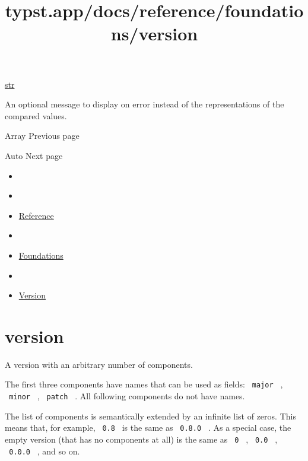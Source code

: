 \href{/docs/reference/foundations/str/}{str}

An optional message to display on error instead of the representations
of the compared values.

\href{/docs/reference/foundations/array/}{\pandocbounded{}}

{ Array } { Previous page }

\href{/docs/reference/foundations/auto/}{\pandocbounded{}}

{ Auto } { Next page }


\title{typst.app/docs/reference/foundations/version}

\begin{itemize}
\tightlist
\item
  \href{/docs}{}
\item
  
\item
  \href{/docs/reference/}{Reference}
\item
  
\item
  \href{/docs/reference/foundations/}{Foundations}
\item
  
\item
  \href{/docs/reference/foundations/version/}{Version}
\end{itemize}

\section{\texorpdfstring{{ version }}{ version }}\label{summary}

A version with an arbitrary number of components.

The first three components have names that can be used as fields:
\texttt{\ major\ } , \texttt{\ minor\ } , \texttt{\ patch\ } . All
following components do not have names.

The list of components is semantically extended by an infinite list of
zeros. This means that, for example, \texttt{\ 0.8\ } is the same as
\texttt{\ 0.8.0\ } . As a special case, the empty version (that has no
components at all) is the same as \texttt{\ 0\ } , \texttt{\ 0.0\ } ,
\texttt{\ 0.0.0\ } , and so on.

